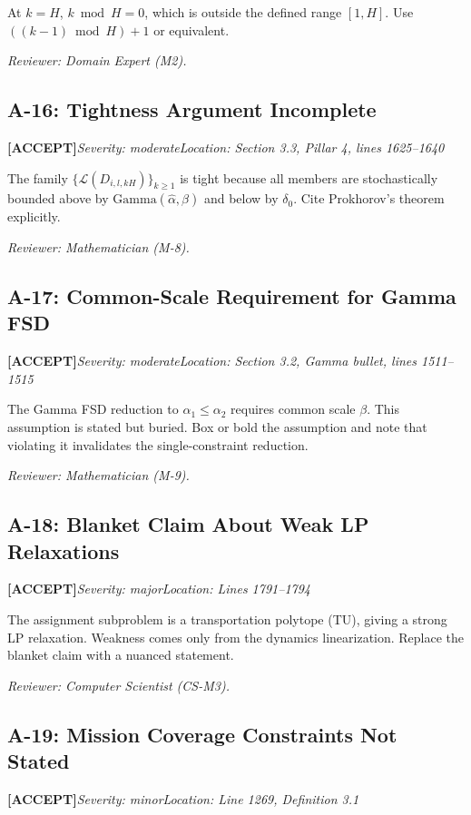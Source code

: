 \documentclass[11pt,a4paper]{article}
\newcommand{\acceptlabel}{\textbf{\textcolor{acceptgreen}{[ACCEPT]}}}
\begin{document}
At $k=H$, $k\bmod H=0$, which is outside the defined range $[1,H]$. Use $((k-1)\bmod H)+1$ or equivalent.

\textit{Reviewer: Domain Expert (M2).}

\subsection{A-16: Tightness Argument Incomplete}
\acceptlabel\quad\textit{Severity: moderate}\quad\textit{Location: Section 3.3, Pillar 4, lines 1625--1640}

The family $\{\mathcal{L}(D_{i,l,kH})\}_{k\ge1}$ is tight because all members are stochastically bounded above by $\mathrm{Gamma}(\hat\alpha,\beta)$ and below by $\delta_0$. Cite Prokhorov's theorem explicitly.

\textit{Reviewer: Mathematician (M-8).}

\subsection{A-17: Common-Scale Requirement for Gamma FSD}
\acceptlabel\quad\textit{Severity: moderate}\quad\textit{Location: Section 3.2, Gamma bullet, lines 1511--1515}

The Gamma FSD reduction to $\alpha_1\le\alpha_2$ requires common scale $\beta$. This assumption is stated but buried. Box or bold the assumption and note that violating it invalidates the single-constraint reduction.

\textit{Reviewer: Mathematician (M-9).}

\subsection{A-18: Blanket Claim About Weak LP Relaxations}
\acceptlabel\quad\textit{Severity: major}\quad\textit{Location: Lines 1791--1794}

The assignment subproblem is a transportation polytope (TU), giving a strong LP relaxation. Weakness comes only from the dynamics linearization. Replace the blanket claim with a nuanced statement.

\textit{Reviewer: Computer Scientist (CS-M3).}

\subsection{A-19: Mission Coverage Constraints Not Stated}
\acceptlabel\quad\textit{Severity: minor}\quad\textit{Location: Line 1269, Definition 3.1}
\end{document}
